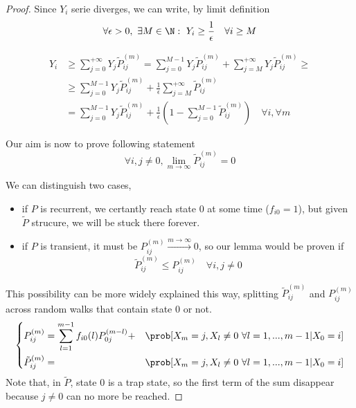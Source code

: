 \begin{proof}
	\proofpart \label{part:Yi_lower_bound}
		Since $Y_i$ serie diverges, we can write, by limit definition
		$$ \forall \epsilon > 0, ~\exists M \in \N : ~Y_i \ge \frac{1}{\epsilon} \quad \forall i \ge M$$

		\begin{equation}\begin{split}
			Y_i & \ge \sum_{j=0}^{+\infty} Y_j \tilde{P}_{ij}^{(m)}
				= \sum_{j=0}^{M-1} Y_j \tilde{P}_{ij}^{(m)}
				+ \sum_{j=M}^{+\infty} Y_j \tilde{P}_{ij}^{(m)} \ge \\
			& \ge \sum_{j=0}^{M-1} Y_j \tilde{P}_{ij}^{(m)}
				+ \frac{1}{\epsilon} \sum_{j=M}^{+\infty} \tilde{P}_{ij}^{(m)} \\
			& = \sum_{j=0}^{M-1} Y_j \tilde{P}_{ij}^{(m)}
				+ \frac{1}{\epsilon} \left( 1 - \sum_{j=0}^{M-1}\tilde{P}_{ij}^{(m)} \right) \quad \forall i, \forall m
		\end{split}\end{equation}

	\proofpart
		Our aim is now to prove following statement
		$$ \forall i,j \neq 0, \lim_{m \to \infty} \tilde{P}_{ij}^{(m)} = 0 $$

		We can distinguish two cases,
		\begin{itemize}
			\item if $P$ is recurrent, we certantly reach state 0 at some time ($f_{i0} = 1$), but given $\tilde{P}$ strucure, we will be stuck there forever.
			\item if $P$ is transient, it must be $P_{ij}^{(m)}\stackrel{m \to \infty}{\longrightarrow} 0 $, so our lemma would be proven if
			$$ \tilde{P}_{ij}^{(m)} \le P_{ij}^{(m)} \quad\forall i, j \neq 0$$
		\end{itemize}

		This possibility can be more widely explained this way, splitting $\tilde{P}_{ij}^{(m)}$ and $P_{ij}^{(m)}$ across random walks	 that contain state 0 or not.
		\begin{equation}
			\left\{ \begin{split}
				& P_{ij}^{(m)} = \sum_{l=1}^{m-1} f_{i0}(l) P_{0j}^{(m-l)} +
				& \prob[X_m = j, X_l \neq 0 ~ \forall l = 1, ..., m-1 | X_0 = i] \\
	 			& \tilde{P}_{ij}^{(m)} =
				& \prob[X_m = j, X_l \neq 0 ~ \forall l = 1, ..., m-1 | X_0 = i] \\
			\end{split} \right.
		\end{equation}
		Note that, in $\tilde{P}$, state $0$ is a trap state, so the first term of the sum disappear because $j \neq 0$ can no more be reached.


\end{proof}
